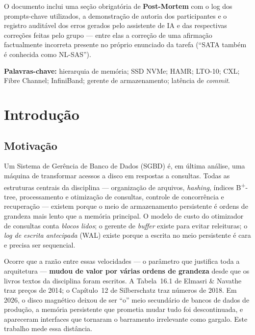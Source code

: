 \documentclass[11pt,a4paper]{article}
\begin{document}
O documento inclui uma seção obrigatória de \textbf{Post-Mortem} com o log dos prompts-chave
utilizados, a demonstração de autoria dos participantes e o registro auditável dos erros
gerados pelo assistente de IA e das respectivas correções feitas pelo grupo --- entre elas
a correção de uma afirmação factualmente incorreta presente no próprio enunciado da tarefa
(``SATA também é conhecida como NL-SAS'').

\vspace{0.8cm}
\textbf{Palavras-chave:} hierarquia de memória; SSD NVMe; HAMR; LTO-10; CXL; Fibre Channel;
InfiniBand; gerente de armazenamento; latência de \emph{commit}.

\newpage
\thispagestyle{empty}
\tableofcontents
\newpage
\setcounter{page}{1}

\section{Introdução}

\subsection{Motivação}

Um Sistema de Gerência de Banco de Dados (SGBD) é, em última análise, uma máquina de
transformar acessos a disco em respostas a consultas. Todas as estruturas centrais da
disciplina --- organização de arquivos, \emph{hashing}, índices B\textsuperscript{+}-tree,
processamento e otimização de consultas, controle de concorrência e recuperação ---
existem porque o meio de armazenamento persistente é ordens de grandeza mais lento que a
memória principal. O modelo de custo do otimizador de consultas conta \emph{blocos lidos};
o gerente de \emph{buffer} existe para evitar releituras; o \emph{log de escrita
antecipada} (WAL) existe porque a escrita no meio persistente é cara e precisa ser
sequencial.

Ocorre que a razão entre essas velocidades --- o parâmetro que justifica toda a
arquitetura --- \textbf{mudou de valor por várias ordens de grandeza} desde que os livros
textos da disciplina foram escritos. A Tabela~16.1 de Elmasri \& Navathe traz preços de
2014; o Capítulo~12 de Silberschatz traz números de 2018. Em 2026, o disco magnético
deixou de ser ``o'' meio secundário de bancos de dados de produção, a memória persistente
que prometia mudar tudo foi descontinuada, e apareceram interfaces que tornaram o
barramento irrelevante como gargalo. Este trabalho mede essa distância.
\end{document}
